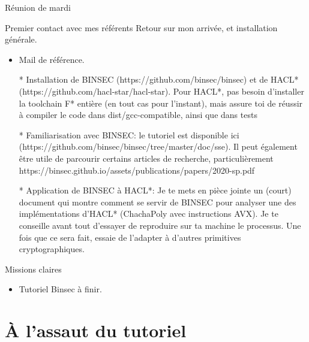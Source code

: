 \documentclass[A4,svgnames,9pt,aspectratio=169]{beamer}
\begin{document}
\begin{frame}{Réunion de mardi}
    \begin{block}{Premier contact avec mes référents}
      Retour sur mon arrivée, et installation générale.
      \begin{itemize}
        \item Mail de référence.
      \end{itemize}

      \tiny{\begin{itemize}
        \item[*] Installation de BINSEC (https://github.com/binsec/binsec) et de HACL* (https://github.com/hacl-star/hacl-star). Pour HACL*, pas besoin d'installer la toolchain F* entière (en tout cas pour l'instant), mais assure toi de réussir à compiler le code dans dist/gcc-compatible, ainsi que dans tests
        \item[*] Familiarisation avec BINSEC: le tutoriel est disponible ici (https://github.com/binsec/binsec/tree/master/doc/sse). Il peut également être utile de parcourir certains articles de recherche, particulièrement https://binsec.github.io/assets/publications/papers/2020-sp.pdf
        \item[*] Application de BINSEC à HACL*: Je te mets en pièce jointe un (court) document qui montre comment se servir de BINSEC pour analyser une des implémentations d'HACL* (ChachaPoly avec instructions AVX). Je te conseille avant tout d'essayer de reproduire sur ta machine le processus. Une fois que ce sera fait, essaie de l'adapter à d'autres primitives cryptographiques.
      \end{itemize}
      }
      
    \end{block}

    \begin{block}{Missions claires}
      \begin{itemize}
        \item Tutoriel Binsec à finir.
      \end{itemize}
    \end{block}

\end{frame}


\section{À l'assaut du tutoriel}
\frame{\sectionpage}
\end{document}
